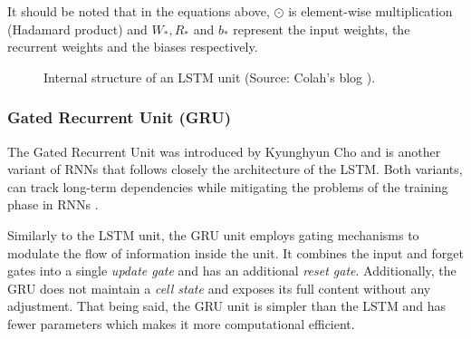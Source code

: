 \documentclass[a4paper, 12pt]{article}
\numberwithin{equation}{section}
\numberwithin{figure}{section}
\numberwithin{table}{section}
\begin{document}
	\newpage
	
	It should be noted that in the equations above, $\odot$ is element-wise multiplication (Hadamard product) and $W_{*}, R_{*}$ and $b_{*}$ represent the input weights, the recurrent weights and the biases respectively.\\
	
	\vspace*{0.5cm}
	
	\begin{figure}[H]
		\caption[Internal structure of an LSTM unit]{Internal structure of an LSTM unit (Source: Colah's blog \cite{colah_blog}).}
		\label{fig:lstm_unit}
	\end{figure}

	\subsubsection{Gated Recurrent Unit (GRU)}
	
	The Gated Recurrent Unit was introduced by Kyunghyun Cho \cite{GRU} and is another variant of RNNs that follows closely the architecture of the LSTM. Both variants, can track long-term dependencies while mitigating the problems of the training phase in RNNs \cite{rnn_learn_difficulties}.\par
	
	Similarly to the LSTM unit, the GRU unit employs gating mechanisms to modulate the flow of information inside the unit. It combines the input and forget gates into a single \textit{update gate} and has an additional \textit{reset gate}. Additionally, the GRU does not maintain a \textit{cell state} and exposes its full content without any adjustment. That being said, the GRU unit is simpler than the LSTM and has fewer parameters which makes it more computational efficient.\par
	
\end{document}
